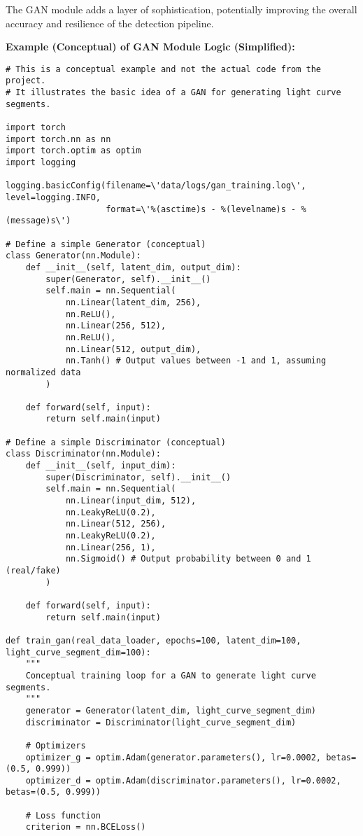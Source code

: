 \documentclass{article}
\begin{document}
The GAN module adds a layer of sophistication, potentially improving the overall accuracy and resilience of the detection pipeline.

\textbf{Example (Conceptual) of GAN Module Logic (Simplified):}
\begin{lstlisting}[caption={Conceptual GAN Module Logic}]
# This is a conceptual example and not the actual code from the project.
# It illustrates the basic idea of a GAN for generating light curve segments.

import torch
import torch.nn as nn
import torch.optim as optim
import logging

logging.basicConfig(filename=\'data/logs/gan_training.log\', level=logging.INFO,
                    format=\'%(asctime)s - %(levelname)s - %(message)s\')

# Define a simple Generator (conceptual)
class Generator(nn.Module):
    def __init__(self, latent_dim, output_dim):
        super(Generator, self).__init__()
        self.main = nn.Sequential(
            nn.Linear(latent_dim, 256),
            nn.ReLU(),
            nn.Linear(256, 512),
            nn.ReLU(),
            nn.Linear(512, output_dim),
            nn.Tanh() # Output values between -1 and 1, assuming normalized data
        )

    def forward(self, input):
        return self.main(input)

# Define a simple Discriminator (conceptual)
class Discriminator(nn.Module):
    def __init__(self, input_dim):
        super(Discriminator, self).__init__()
        self.main = nn.Sequential(
            nn.Linear(input_dim, 512),
            nn.LeakyReLU(0.2),
            nn.Linear(512, 256),
            nn.LeakyReLU(0.2),
            nn.Linear(256, 1),
            nn.Sigmoid() # Output probability between 0 and 1 (real/fake)
        )

    def forward(self, input):
        return self.main(input)

def train_gan(real_data_loader, epochs=100, latent_dim=100, light_curve_segment_dim=100):
    """
    Conceptual training loop for a GAN to generate light curve segments.
    """
    generator = Generator(latent_dim, light_curve_segment_dim)
    discriminator = Discriminator(light_curve_segment_dim)

    # Optimizers
    optimizer_g = optim.Adam(generator.parameters(), lr=0.0002, betas=(0.5, 0.999))
    optimizer_d = optim.Adam(discriminator.parameters(), lr=0.0002, betas=(0.5, 0.999))

    # Loss function
    criterion = nn.BCELoss()


\end{lstlisting}
\end{document}
